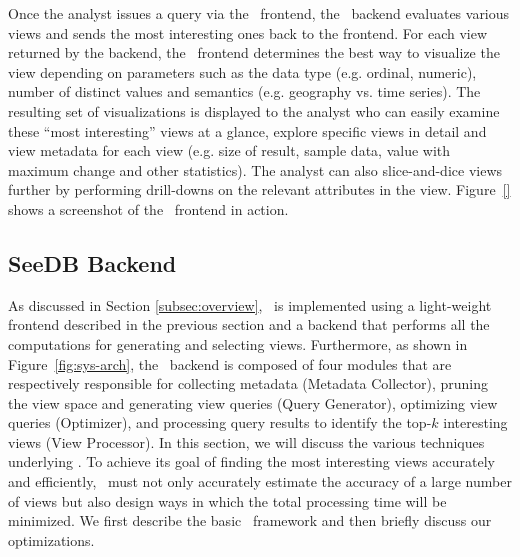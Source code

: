 Once the analyst issues a query via the \SeeDB\ frontend, the \SeeDB\ backend
evaluates various views and sends the most interesting ones back to the
frontend.
For each view returned by the backend, the \SeeDB\ frontend determines the best
way to visualize the view depending on parameters such as the data
type (e.g. ordinal, numeric), number of distinct values and semantics (e.g.
geography vs.
time series).
The resulting set of visualizations is displayed to the analyst who can easily
examine these ``most interesting'' views at a glance, explore specific views in detail and
view metadata for each view (e.g. size of result, sample data, value with
maximum change and other statistics). 
The analyst can also slice-and-dice views further by performing drill-downs on
the relevant attributes in the view. 
Figure~\ref{} shows a screenshot of the \SeeDB\ frontend in action.

\subsection{SeeDB Backend}
\label{subsec:seedb_backend}

As discussed in Section \ref{subsec:overview}, \SeeDB\ is implemented using a
light-weight frontend described in the previous section and a backend that
performs all the computations for generating and selecting views. Furthermore,
as shown in Figure~\ref{fig:sys-arch}, the \SeeDB\ backend is composed of four
modules that are respectively responsible for collecting metadata (Metadata Collector), pruning
the view space and generating view queries (Query Generator), optimizing view
queries (Optimizer), and processing query results to identify the top-$k$
interesting views (View Processor). In this section, we will discuss the various
techniques underlying \SeeDB. To achieve its goal of finding the most
interesting views accurately and efficiently, \SeeDB\ must not only accurately
estimate the accuracy of a large number of views but also design ways in which
the total processing time will be minimized.
We first describe the basic \SeeDB\ framework and then briefly discuss our optimizations.


